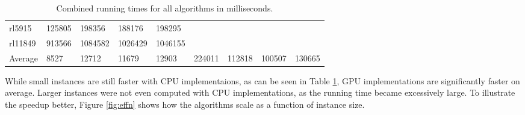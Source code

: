 \documentclass[english, 12pt, a4paper, sci, utf8, a-1b, online]{aaltothesis}
\begin{document}
\begin{table}[H]
\begin{adjustbox}{center}
\begin{tabular}{@{}lllllllll@{}}
rl5915   & 125805                                             & 198356                                               & 188176                                               & 198295                                               &                                                    &                                                      &                                                      &                                                      \\
rl11849  & 913566                                             & 1084582                                              & 1026429                                              & 1046155                                              &                                                    &                                                      &                                                      &                                                      \\ \midrule
Average & 8527 & 12712 & 11679 & 12903 & 224011 & 112818 & 100507 & 130665 \\ \bottomrule
\end{tabular}
\end{adjustbox}
\caption{Combined running times for all algorithms in milliseconds.} \label{table:eff3}
\end{table}

While small instances are still faster with CPU implementaions, as can be seen in Table \ref{table:eff3}, GPU implementations are significantly faster on average. Larger instances were not even computed with CPU implementations, as the running time became excessively large. To illustrate the speedup better, Figure \ref{fig:effn} shows how the algorithms scale as a function of instance size.
\end{document}
